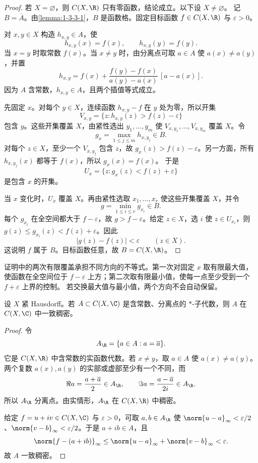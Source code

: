 \begin{proof}
若 $X=\varnothing$，则 $C(X,\R)$ 只有零函数，结论成立。以下设 $X\ne\varnothing$。
记 $B=\overline A$。由\cref{lemma:1-3-3-1}，$B$ 是函数格。固定目标函数
$f\in C(X,\R)$ 与 $\varepsilon>0$。

对 $x,y\in X$ 构造 $h_{x,y}\in A$，使
\[
 h_{x,y}(x)=f(x),\qquad h_{x,y}(y)=f(y).
\]
当 $x=y$ 时取常数 $f(x)$。当 $x\ne y$ 时，由分离点可取 $a\in A$ 使 $a(x)\ne a(y)$，并置
\[
 h_{x,y}
 =f(x)+\frac{f(y)-f(x)}{a(y)-a(x)}\,[a-a(x)].
\]
因为 $A$ 含常数，$h_{x,y}\in A$，且两个插值等式成立。

先固定 $x$。对每个 $y\in X$，连续函数 $h_{x,y}-f$ 在 $y$ 处为零，所以开集
\[
 V_{x,y}=\{z:h_{x,y}(z)>f(z)-\varepsilon\}
\]
包含 $y$。这些开集覆盖 $X$，由紧性选出 $y_1,\ldots,y_m$ 使
$V_{x,y_1},\ldots,V_{x,y_m}$ 覆盖 $X$。令
\[
 g_x=\max_{1\le j\le m}h_{x,y_j}\in B.
\]
对每个 $z\in X$，至少一个 $V_{x,y_j}$ 包含 $z$，故
$g_x(z)>f(z)-\varepsilon$。另一方面，所有 $h_{x,y_j}(x)$ 都等于 $f(x)$，所以 $g_x(x)=f(x)$。
于是
\[
 U_x=\{z:g_x(z)<f(z)+\varepsilon\}
\]
是包含 $x$ 的开集。

当 $x$ 变化时，$U_x$ 覆盖 $X$。再由紧性选取 $x_1,\ldots,x_r$ 使这些开集覆盖 $X$，并令
\[
  g=\min_{1\le i\le r}g_{x_i}\in B.
\]
每个 $g_{x_i}$ 在全空间都大于 $f-\varepsilon$，故
$g>f-\varepsilon$。给定 $z\in X$，选 $i$ 使 $z\in U_{x_i}$，则
$g(z)\le g_{x_i}(z)<f(z)+\varepsilon$。因此
\[
  |g(z)-f(z)|<\varepsilon\qquad(z\in X).
\]
这说明 $f$ 属于 $B$。目标函数任意，故 $B=C(X,\R)$。
\end{proof}

证明中的两次有限覆盖承担不同方向的不等式。第一次对固定 $x$ 取有限最大值，使函数在全空间位于
$f-\varepsilon$ 上方；第二次取有限最小值，使每一点至少受到一个 $f+\varepsilon$ 上界的控制。
若交换最大值与最小值，两个方向不会自动保留。

\begin{theorem}\label{theorem:1-3-3-3}
设 $X$ 紧 Hausdorff。若 $A\subset C(X,\C)$ 是含常数、分离点的 $*$-子代数，则 $A$ 在
$C(X,\C)$ 中一致稠密。
\end{theorem}

\begin{proof}
令
\[
 A_{\R}=\{a\in A:a=\overline a\}.
\]
它是 $C(X,\R)$ 中含常数的实函数代数。若 $x\ne y$，取 $a\in A$ 使 $a(x)\ne a(y)$。两个复数
$a(x),a(y)$ 的实部或虚部至少有一个不同，而
\[
 \Re a=\frac{a+\overline a}{2}\in A_{\R},
 \qquad
 \Im a=\frac{a-\overline a}{2i}\in A_{\R}.
\]
所以 $A_{\R}$ 分离点。由实情形，$A_{\R}$ 在 $C(X,\R)$ 中稠密。

给定 $f=u+iv\in C(X,\C)$ 与 $\varepsilon>0$，可取 $a,b\in A_{\R}$ 使
$\norm{u-a}_\infty<\varepsilon/2$、$\norm{v-b}_\infty<\varepsilon/2$。于是 $a+ib\in A$，且
\[
 \norm{f-(a+ib)}_\infty
 \le\norm{u-a}_\infty+\norm{v-b}_\infty<\varepsilon.
\]
故 $A$ 一致稠密。
\end{proof}


